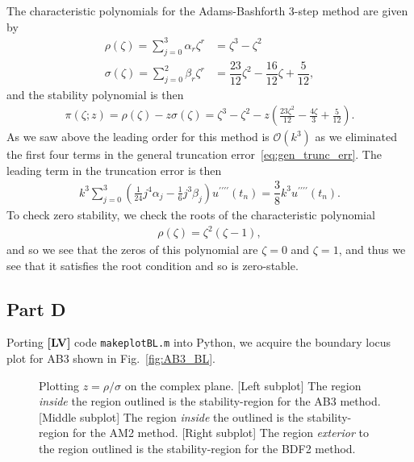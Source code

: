 \documentclass[12pt]{article}
\newcommand{\bO}{\mathcal{O}}
\begin{document}
The characteristic polynomials for the Adams-Bashforth 3-step method are given by
\begin{align}
\rho(\zeta) = \sum_{j=0}^{3}\alpha_{r}\zeta^{r} &= \zeta^{3} - \zeta^{2}\\
\sigma(\zeta) = \sum_{j=0}^{2}\beta_{r}\zeta^{r} &= \dfrac{23}{12}\zeta^{2} -\dfrac{16}{12}\zeta + \dfrac{5}{12},
\end{align}
and the stability polynomial is then 
\begin{align}
	\pi(\zeta; z) = \rho(\zeta) - z\sigma(\zeta) = \zeta ^3-\zeta ^2- z\left(\frac{23 \zeta ^2}{12}-\frac{4 \zeta }{3}+\frac{5}{12}\right).
\end{align}
As we saw above the leading order for this method is $\bO(k^{3})$ as we eliminated the first four terms in the general truncation error~\eqref{eq:gen_trunc_err}. The leading term in the truncation error is then 
\begin{align}
	k^{3}\sum_{j=0}^{3}\left(\frac{1}{24} j^{4} \alpha_{j}-\frac{1}{6} j^{3} \beta_{j}\right) u^{\prime\prime\prime\prime}\left(t_{n}\right) = \dfrac{3}{8}k^{3}u^{\prime\prime\prime\prime}(t_{n}).
\end{align}
To check zero stability, we check the roots of the characteristic polynomial
\begin{align}
	\rho(\zeta) = \zeta^{2}(\zeta-1),
\end{align}
and so we see that the zeros of this polynomial are $\zeta = 0$ and $\zeta = 1$, and thus we see that it satisfies the root condition and so is zero-stable.

\subsection*{Part D}

Porting \textbf{[LV]} code \verb|makeplotBL.m| into Python, we acquire the boundary locus plot for AB3 shown in Fig.~\ref{fig:AB3_BL}.
\begin{figure}[!h]
    \centering
    \caption{Plotting $z = \rho/\sigma$ on the complex plane. [Left subplot] The region \emph{inside} the region outlined is the stability-region for the AB3 method. [Middle subplot] The region \emph{inside} the outlined is the stability-region for the AM2 method. 
    [Right subplot] The region \emph{exterior} to the region outlined is the stability-region for the BDF2 method.
    }
    \label{fig:BL_plots} 
\end{figure}
\end{document}
